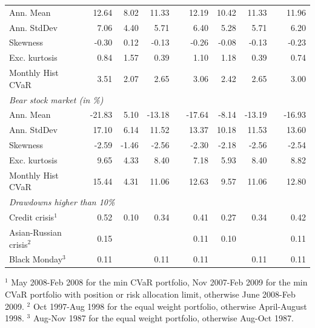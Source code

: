 \documentclass[12pt,a4paper]{article}
\begin{document}
\begin{table}[t]
\begin{center}
{\begin{tabular}{|lc rrrrrrrrr | }
 \multicolumn{2}{|l}{Ann. Mean  } 	     &    12.64 & 8.02 & 11.33& & 12.19 & 10.42 & 11.33 & & 11.96  \\
 \multicolumn{2}{|l}{Ann. StdDev }       &    7.06 & 4.40 &5.71&& 6.40 & 5.28 & 5.71 &  & 6.20    \\
  \multicolumn{2}{|l}{Skewness }       &      -0.30 & 0.12 &-0.13&& -0.26 & -0.08 & -0.13 &  & -0.23   \\
    \multicolumn{2}{|l}{Exc. kurtosis }   &     0.84 & 1.57&0.39& & 1.10 & 1.18 & 0.39 &  & 0.74   \\
 \multicolumn{2}{|l}{Monthly Hist  CVaR}   &    3.51 & 2.07 &2.65&& 3.06 & 2.42 & 2.65 &  & 3.00 \\ \hline
 \multicolumn{11}{|l|}{\emph{Bear stock market (in \%)}} \\
 \multicolumn{2}{|l}{Ann. Mean  }    &      -21.83 & 5.10 & -13.18&& -17.64 & -8.14 & -13.19 &  & -16.93 \\
 \multicolumn{2}{|l}{Ann. StdDev}     &      17.10 & 6.14 &11.52&& 13.37 & 10.18 & 11.53 &  & 13.60   \\
  \multicolumn{2}{|l}{Skewness}     &         -2.59 & -1.46 & -2.56&& -2.30 & -2.18 & -2.56 & & -2.54   \\
    \multicolumn{2}{|l}{Exc. kurtosis}   &      9.65 & 4.33 &8.40&& 7.18 & 5.93 & 8.40 &  & 8.82     \\
 \multicolumn{2}{|l}{Monthly Hist  CVaR}   &	 15.44 & 4.31 &11.06 && 12.63 & 9.57 & 11.06 & & 12.80 \\\hline
\multicolumn{11}{|l|}{ \emph{Drawdowns higher than 10\%}  }  \\
 \multicolumn{2}{|l}{Credit crisis$^{1}$}       &  0.52 &  0.10 & 0.34&&  0.41 & 0.27 & 0.34 & & 0.42    \\
 \multicolumn{2}{|l}{Asian-Russian crisis$^{2}$}& 0.15     &  & &   &  0.11    & 0.10 &      &   & 0.11   \\
 \multicolumn{2}{|l}{ Black Monday$^{3}$}	& 0.11 &  & 0.11& &   0.11 &      & 0.11 &  & 0.11 \\
 \hline
\end{tabular}
}
\end{center}


{\scriptsize $^{1}$ May 2008-Feb 2008 for the min CVaR portfolio, Nov 2007-Feb 2009 for the min CVaR portfolio with position or risk allocation limit, otherwise June 2008-Feb 2009.  $^{2}$ Oct 1997-Aug 1998 for the equal weight portfolio, otherwise April-August 1998. $^{3}$ Aug-Nov 1987 for the equal weight portfolio, otherwise Aug-Oct 1987. }
\end{table}
\end{document}
